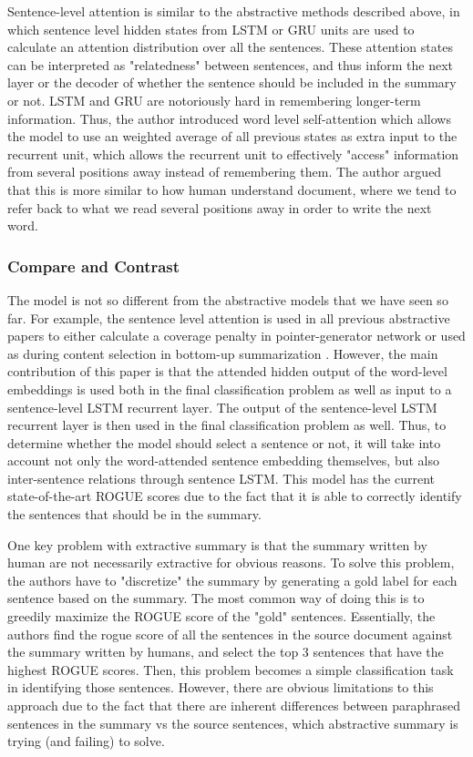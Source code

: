 \documentclass[11pt,a4paper]{article}
\begin{document}
Sentence-level attention is similar to the abstractive methods described above, in which sentence level hidden states from LSTM or GRU units are used to calculate an attention distribution over all the sentences. These attention states can be interpreted as "relatedness" between sentences, and thus inform the next layer or the decoder of whether the sentence should be included in the summary or not. LSTM and GRU are notoriously hard in remembering longer-term information. Thus, the author introduced word level self-attention which allows the model to use an weighted average of all previous states as extra input to the recurrent unit, which allows the recurrent unit to effectively "access" information from several positions away instead of remembering them. The author argued that this is more similar to how human understand document, where we tend to refer back to what we read several positions away in order to write the next word.

\subsubsection{Compare and Contrast}
The model is not so different from the abstractive models that we have seen so far. For example, the sentence level attention is used in all previous abstractive papers to either calculate a coverage penalty in pointer-generator network \cite{pointer-generator} or used as during content selection in bottom-up summarization \cite{bottom-up}. However, the main contribution of this paper is that the attended hidden output of the word-level embeddings is used both in the final classification problem as well as input to a sentence-level LSTM recurrent layer. The output of the sentence-level LSTM recurrent layer is then used in the final classification problem as well. Thus, to determine whether the model should select a sentence or not, it will take into account not only the word-attended sentence embedding themselves, but also inter-sentence relations through sentence LSTM. This model has the current state-of-the-art ROGUE scores due to the fact that it is able to correctly identify the sentences that should be in the summary.

One key problem with extractive summary is that the summary written by human are not necessarily extractive for obvious reasons. To solve this problem, the authors have to "discretize" the summary by generating a gold label for each sentence based on the summary. The most common way of doing this is to greedily maximize the ROGUE score of the "gold" sentences. Essentially, the authors find the rogue score of all the sentences in the source document against the summary written by humans, and select the top 3 sentences that have the highest ROGUE scores. Then, this problem becomes a simple classification task in identifying those sentences. However, there are obvious limitations to this approach due to the fact that there are inherent differences between paraphrased sentences in the summary vs the source sentences, which abstractive summary is trying (and failing) to solve.
\end{document}

